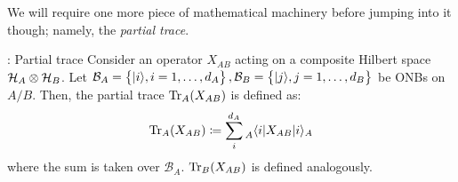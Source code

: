We will require one more piece of mathematical machinery before jumping into it though; namely, the \emph{partial trace}.

\begin{defbox}{: Partial trace}
    Consider an operator $X_{AB}$ acting on a composite Hilbert space $\mathcal{H}_A \otimes \mathcal{H}_B$. Let $\mathcal{B}_A = \set{\lvert i \rangle, i = 1, \ldots, d_A}, \mathcal{B}_B = \set{\lvert j \rangle, j = 1, \ldots, d_B}$ be ONBs on $A/B$. Then, the partial trace $\mathrm{Tr}_A(X_{AB})$ is defined as:
    \begin{equation}
        \mathrm{Tr}_A(X_{AB}) \coloneqq \sum_i^{d_A} \prescript{}{A}{\langle i \rvert}X_{AB}\lvert i \rangle_A
    \end{equation}
    where the sum is taken over $\mathcal{B}_A$. $\mathrm{Tr}_B(X_{AB})$ is defined analogously.
\end{defbox}

